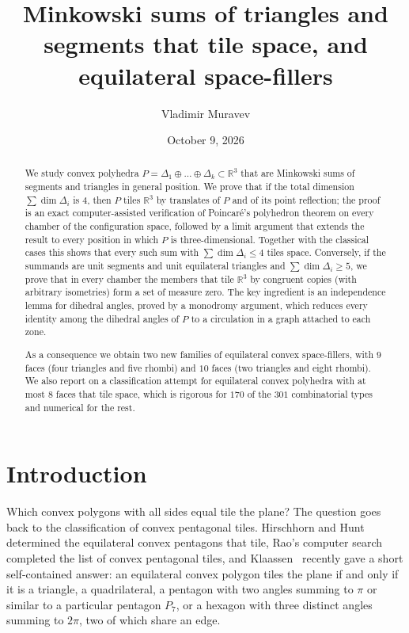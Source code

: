 \documentclass[11pt]{amsart}
\title[Minkowski sums of simplices that tile space]{Minkowski sums of triangles and segments that tile space, and equilateral space-fillers}
\author{Vladimir Muravev}
\date{October 9, 2026}
\theoremstyle{definition}
\newcommand{\R}{\mathbb{R}}
\newcommand{\msum}{\oplus}
\begin{document}
\begin{abstract}
We study convex polyhedra $P = \Delta_1 \msum \dots \msum \Delta_k \subset \R^3$ that are Minkowski sums of
segments and triangles in general position. We prove that if the total dimension $\sum \dim \Delta_i$ is
$4$, then $P$ tiles $\R^3$ by translates of $P$ and of its point reflection; the proof is an exact
computer-assisted verification of Poincar\'e's polyhedron theorem on every chamber of the configuration space,
followed by a limit argument that extends the result to every position in which $P$ is three-dimensional. Together with
the classical cases this shows that every such sum with $\sum\dim\Delta_i\le 4$ tiles space. Conversely, if the
summands are unit segments and unit equilateral triangles and $\sum \dim \Delta_i \geq 5$, we prove that in every
chamber the members that tile $\R^3$ by congruent copies (with arbitrary isometries) form a set of measure zero.
The key ingredient is an independence lemma for dihedral angles, proved by a monodromy argument, which reduces
every identity among the dihedral angles of $P$ to a circulation in a graph attached to each zone.

As a consequence we obtain two new families of equilateral convex space-fillers, with $9$ faces
(four triangles and five rhombi) and $10$ faces (two triangles and eight rhombi). We also report on a
classification attempt for equilateral convex polyhedra with at most $8$ faces that tile space, which is
rigorous for $170$ of the $301$ combinatorial types and numerical for the rest.
\end{abstract}
\maketitle

\section{Introduction}

Which convex polygons with all sides equal tile the plane? The question goes back to the classification of
convex pentagonal tiles. Hirschhorn and Hunt~\cite{HH85} determined the equilateral convex pentagons that tile,
Rao's computer search~\cite{Rao17} completed the list of convex pentagonal tiles, and Klaassen~\cite{Kla25}
recently gave a short self-contained answer: an equilateral convex polygon tiles the plane if and only if it is
a triangle, a quadrilateral, a pentagon with two angles summing to $\pi$ or similar to a particular pentagon $P_7$,
or a hexagon with three distinct angles summing to $2\pi$, two of which share an edge.
\end{document}
